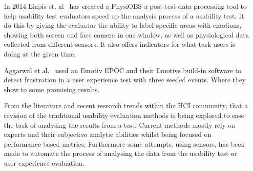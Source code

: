 In 2014 Liapis et. al~\cite{fusion4} has created a PhysiOBS a post-test data processing tool to help usability test evaluators speed up the analysis process of a usability test. It do this by giving the evaluator the ability to label specific areas with emotions, showing both screen and face camera in one window, as well as physiological data collected from different sensors. It also offers indicators for what task users is doing at the given time.

Aggarwal et al.~\cite{sensor_example} used an Emotiv EPOC and their Emotivs build-in software to detect frustration in a user experience test with three seeded events. Where they show to some promising results.

From the literature and recent research trends within the HCI community, that a revision of the traditional usability evaluation methods is being explored to ease the task of analysing the results from a test. Current methods mostly rely on experts and their subjective analytic abilities whilst being focused on performance-based metrics.
Furthermore some attempts, using sensors, has been made to automate the process of analysing the data from the usability test or user experience evaluation. 